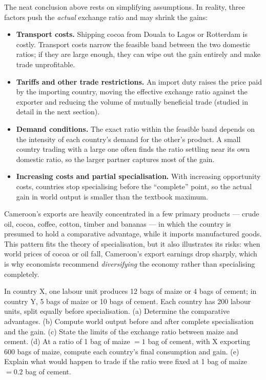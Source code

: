 \documentclass[11pt]{article}
\newcounter{popsec}
\newcounter{popsub}
\newcommand{\courssub}[1]{%
  \stepcounter{popsub}%
  \par\vspace{9pt}\noindent{\popxbold\fontsize{11.5}{13}\selectfont\color{popink}{\color{poporange}\thepopsec.\thepopsub}\hspace{6pt}#1}\par\nopagebreak\vspace{4pt}
}
\begin{document}
\courssub{Real-World Qualifications}

The neat conclusion above rests on simplifying assumptions. In reality, three factors push the \emph{actual} exchange ratio and may shrink the gains:

\begin{itemize}
\item \textbf{Transport costs.} Shipping cocoa from Douala to Lagos or Rotterdam is costly. Transport costs narrow the feasible band between the two domestic ratios; if they are large enough, they can wipe out the gain entirely and make trade unprofitable.
\item \textbf{Tariffs and other trade restrictions.} An import duty raises the price paid by the importing country, moving the effective exchange ratio against the exporter and reducing the volume of mutually beneficial trade (studied in detail in the next section).
\item \textbf{Demand conditions.} The exact ratio within the feasible band depends on the intensity of each country's demand for the other's product. A small country trading with a large one often finds the ratio settling near its own domestic ratio, so the larger partner captures most of the gain.
\item \textbf{Increasing costs and partial specialisation.} With increasing opportunity costs, countries stop specialising before the ``complete'' point, so the actual gain in world output is smaller than the textbook maximum.
\end{itemize}

\begin{savaistu}
Cameroon's exports are heavily concentrated in a few primary products --- crude oil, cocoa, coffee, cotton, timber and bananas --- in which the country is presumed to hold a comparative advantage, while it imports manufactured goods. This pattern fits the theory of specialisation, but it also illustrates its risks: when world prices of cocoa or oil fall, Cameroon's export earnings drop sharply, which is why economists recommend \emph{diversifying} the economy rather than specialising completely.
\end{savaistu}

\begin{exercice}[Practice]
In country X, one labour unit produces 12 bags of maize or 4 bags of cement; in country Y, 5 bags of maize or 10 bags of cement. Each country has 200 labour units, split equally before specialisation. (a) Determine the comparative advantages. (b) Compute world output before and after complete specialisation and the gain. (c) State the limits of the exchange ratio between maize and cement. (d) At a ratio of 1 bag of maize $= 1$ bag of cement, with X exporting 600 bags of maize, compute each country's final consumption and gain. (e) Explain what would happen to trade if the ratio were fixed at 1 bag of maize $= 0.2$ bag of cement.
\end{exercice}
\end{document}
